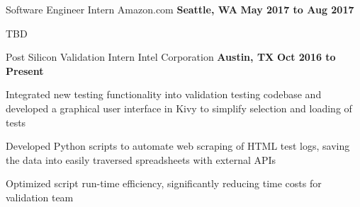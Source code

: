 \begin{cventries}
  \cventry
    {\normalsize Software Engineer Intern}
    {\large Amazon.com}
    {\normalsize \textbf{Seattle, WA}}
    {\normalsize \textbf{May 2017 to Aug 2017}}
    {
      \begin{cvitems}
        \item {\normalsize TBD}
      \end{cvitems}
    }
  \cventry
    {\normalsize Post Silicon Validation Intern}
    {\large Intel Corporation}
    {\normalsize \textbf{Austin, TX}}
    {\normalsize \textbf{Oct 2016 to Present}}
    {
      \begin{cvitems}
        \item {\normalsize Integrated new testing functionality into validation testing codebase and developed a graphical user interface in Kivy to simplify selection and loading of tests}
        \item {\normalsize Developed Python scripts to automate web scraping of HTML test logs, saving the data into easily traversed spreadsheets with external APIs}
        \item {\normalsize Optimized script run-time efficiency, significantly reducing time costs for validation team}
      \end{cvitems}
    }
\end{cventries}
